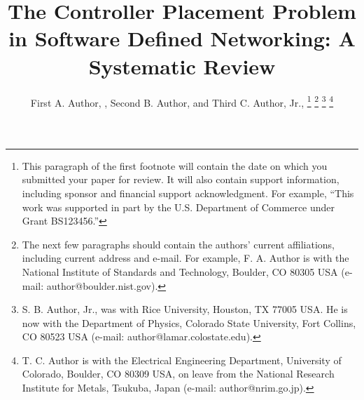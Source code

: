 \documentclass{IEEEtran}
\begin{document}
\title{The Controller Placement Problem in Software Defined Networking: A Systematic Review}
\author{First A. Author, , Second B. Author, and Third C. Author, Jr., 
\thanks{This paragraph of the first footnote will contain the date on 
which you submitted your paper for review. It will also contain support 
information, including sponsor and financial support acknowledgment. For 
example, ``This work was supported in part by the U.S. Department of 
Commerce under Grant BS123456.'' }
\thanks{The next few paragraphs should contain 
the authors' current affiliations, including current address and e-mail. For 
example, F. A. Author is with the National Institute of Standards and 
Technology, Boulder, CO 80305 USA (e-mail: author@boulder.nist.gov). }
\thanks{S. B. Author, Jr., was with Rice University, Houston, TX 77005 USA. He is 
now with the Department of Physics, Colorado State University, Fort Collins, 
CO 80523 USA (e-mail: author@lamar.colostate.edu).}
\thanks{T. C. Author is with 
the Electrical Engineering Department, University of Colorado, Boulder, CO 
80309 USA, on leave from the National Research Institute for Metals, 
Tsukuba, Japan (e-mail: author@nrim.go.jp).}}

\maketitle



\end{document}
